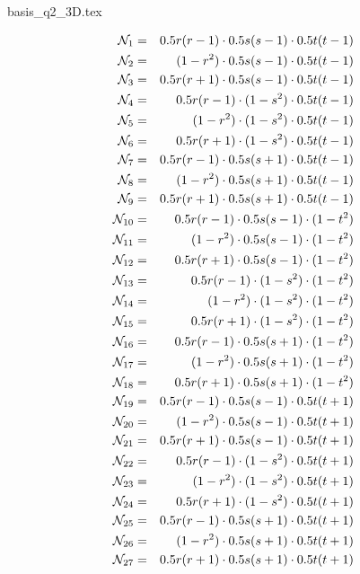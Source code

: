 \begin{flushright} {\tiny {\color{gray} basis\_q2\_3D.tex}} \end{flushright}

\begin{center}

\end{center}

\begin{eqnarray}
{\mathcal{N}}_{1} &=& 0.5r(r-1)  \cdot 0.5s(s-1) \cdot 0.5t(t-1) \nonumber\\
{\mathcal{N}}_{2} &=& (1-r^2)    \cdot 0.5s(s-1) \cdot 0.5t(t-1) \nonumber\\
{\mathcal{N}}_{3} &=& 0.5r(r+1)  \cdot 0.5s(s-1) \cdot 0.5t(t-1) \nonumber\\
{\mathcal{N}}_{4} &=&  0.5r(r-1) \cdot (1-s^2)   \cdot 0.5t(t-1) \nonumber\\
{\mathcal{N}}_{5} &=&  (1-r^2)   \cdot (1-s^2)   \cdot 0.5t(t-1) \nonumber\\
{\mathcal{N}}_{6} &=& 0.5r(r+1)  \cdot (1-s^2)   \cdot 0.5t(t-1) \nonumber\\
{\mathcal{N}}_{7} &=&  0.5r(r-1) \cdot 0.5s(s+1) \cdot 0.5t(t-1) \nonumber\\
{\mathcal{N}}_{8} &=&  (1-r^2)   \cdot 0.5s(s+1) \cdot 0.5t(t-1) \nonumber\\
{\mathcal{N}}_{9} &=& 0.5r(r+1)  \cdot 0.5s(s+1) \cdot 0.5t(t-1) \nonumber\\
{\mathcal{N}}_{10}&=&  0.5r(r-1) \cdot 0.5s(s-1) \cdot (1-t^2) \nonumber\\
{\mathcal{N}}_{11}&=&  (1-r^2)   \cdot 0.5s(s-1) \cdot (1-t^2) \nonumber\\
{\mathcal{N}}_{12}&=& 0.5r(r+1)  \cdot 0.5s(s-1) \cdot (1-t^2) \nonumber\\
{\mathcal{N}}_{13}&=&  0.5r(r-1) \cdot (1-s^2)   \cdot (1-t^2) \nonumber\\
{\mathcal{N}}_{14}&=&  (1-r^2)   \cdot (1-s^2)   \cdot (1-t^2) \nonumber\\
{\mathcal{N}}_{15}&=& 0.5r(r+1)  \cdot (1-s^2)   \cdot (1-t^2) \nonumber\\
{\mathcal{N}}_{16}&=&  0.5r(r-1) \cdot 0.5s(s+1) \cdot (1-t^2) \nonumber\\
{\mathcal{N}}_{17}&=&  (1-r^2)   \cdot 0.5s(s+1) \cdot (1-t^2) \nonumber\\
{\mathcal{N}}_{18}&=& 0.5r(r+1)  \cdot 0.5s(s+1) \cdot (1-t^2) \nonumber\\
{\mathcal{N}}_{19}&=&  0.5r(r-1) \cdot 0.5s(s-1) \cdot 0.5t(t+1) \nonumber\\
{\mathcal{N}}_{20}&=&  (1-r^2)   \cdot 0.5s(s-1) \cdot 0.5t(t+1) \nonumber\\
{\mathcal{N}}_{21}&=& 0.5r(r+1)  \cdot 0.5s(s-1) \cdot 0.5t(t+1) \nonumber\\
{\mathcal{N}}_{22}&=&  0.5r(r-1) \cdot (1-s^2)   \cdot 0.5t(t+1) \nonumber\\
{\mathcal{N}}_{23}&=&  (1-r^2)   \cdot (1-s^2)   \cdot 0.5t(t+1) \nonumber\\
{\mathcal{N}}_{24}&=& 0.5r(r+1)  \cdot (1-s^2)   \cdot 0.5t(t+1) \nonumber\\
{\mathcal{N}}_{25}&=&  0.5r(r-1) \cdot 0.5s(s+1) \cdot 0.5t(t+1) \nonumber\\
{\mathcal{N}}_{26}&=&  (1-r^2)   \cdot 0.5s(s+1) \cdot 0.5t(t+1) \nonumber\\
{\mathcal{N}}_{27}&=& 0.5r(r+1)  \cdot 0.5s(s+1) \cdot 0.5t(t+1) \nonumber
\end{eqnarray}






